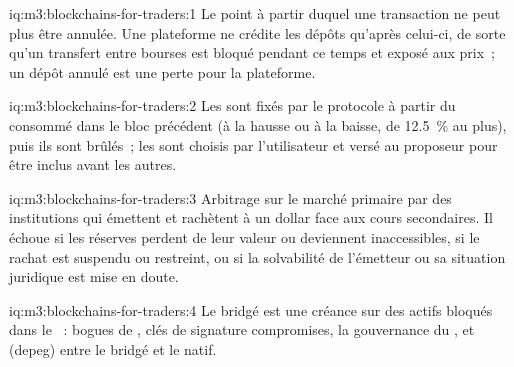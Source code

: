 \begin{solution}{iq:m3:blockchains-for-traders:1}
Le point à partir duquel une transaction ne peut plus être annulée. Une plateforme ne crédite les dépôts qu'après celui-ci, de sorte qu'un transfert
entre bourses est bloqué pendant ce temps et exposé aux prix~; un dépôt annulé est une perte pour la plateforme.
\end{solution}

\begin{solution}{iq:m3:blockchains-for-traders:2}
Les  sont fixés par le protocole à partir du  consommé dans le bloc précédent (à la hausse ou à la baisse, de 12.5~\% au plus), puis ils sont brûlés~; les
 sont choisis par l'utilisateur et versé au proposeur pour être inclus avant les autres.
\end{solution}

\begin{solution}{iq:m3:blockchains-for-traders:3}
Arbitrage sur le marché primaire par des institutions qui émettent et rachètent à un dollar face aux cours secondaires. Il échoue si
les réserves perdent de leur valeur ou deviennent inaccessibles, si le rachat est suspendu ou restreint, ou si la solvabilité de l'émetteur ou
sa situation juridique est mise en doute.
\end{solution}

\begin{solution}{iq:m3:blockchains-for-traders:4}
Le  bridgé est une créance sur des actifs bloqués dans le ~: bogues de , clés de signature compromises, la
gouvernance du , et  (depeg) entre le  bridgé et le  natif.
\end{solution}

